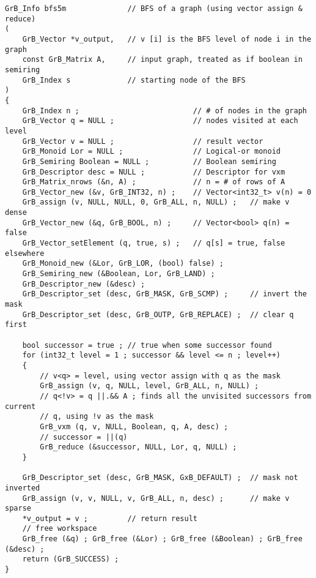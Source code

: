 \documentclass[12pt]{article}
\begin{document}
\newpage
\begin{mdframed}[userdefinedwidth=6in]
{\footnotesize
\begin{verbatim}
GrB_Info bfs5m              // BFS of a graph (using vector assign & reduce)
(
    GrB_Vector *v_output,   // v [i] is the BFS level of node i in the graph
    const GrB_Matrix A,     // input graph, treated as if boolean in semiring
    GrB_Index s             // starting node of the BFS
)
{
    GrB_Index n ;                          // # of nodes in the graph
    GrB_Vector q = NULL ;                  // nodes visited at each level
    GrB_Vector v = NULL ;                  // result vector
    GrB_Monoid Lor = NULL ;                // Logical-or monoid
    GrB_Semiring Boolean = NULL ;          // Boolean semiring
    GrB_Descriptor desc = NULL ;           // Descriptor for vxm
    GrB_Matrix_nrows (&n, A) ;             // n = # of rows of A
    GrB_Vector_new (&v, GrB_INT32, n) ;    // Vector<int32_t> v(n) = 0
    GrB_assign (v, NULL, NULL, 0, GrB_ALL, n, NULL) ;   // make v dense
    GrB_Vector_new (&q, GrB_BOOL, n) ;     // Vector<bool> q(n) = false
    GrB_Vector_setElement (q, true, s) ;   // q[s] = true, false elsewhere
    GrB_Monoid_new (&Lor, GrB_LOR, (bool) false) ;
    GrB_Semiring_new (&Boolean, Lor, GrB_LAND) ;
    GrB_Descriptor_new (&desc) ;
    GrB_Descriptor_set (desc, GrB_MASK, GrB_SCMP) ;     // invert the mask
    GrB_Descriptor_set (desc, GrB_OUTP, GrB_REPLACE) ;  // clear q first

    bool successor = true ; // true when some successor found
    for (int32_t level = 1 ; successor && level <= n ; level++)
    {
        // v<q> = level, using vector assign with q as the mask
        GrB_assign (v, q, NULL, level, GrB_ALL, n, NULL) ;
        // q<!v> = q ||.&& A ; finds all the unvisited successors from current
        // q, using !v as the mask
        GrB_vxm (q, v, NULL, Boolean, q, A, desc) ;
        // successor = ||(q)
        GrB_reduce (&successor, NULL, Lor, q, NULL) ;
    }

    GrB_Descriptor_set (desc, GrB_MASK, GxB_DEFAULT) ;  // mask not inverted
    GrB_assign (v, v, NULL, v, GrB_ALL, n, desc) ;      // make v sparse
    *v_output = v ;         // return result
    // free workspace
    GrB_free (&q) ; GrB_free (&Lor) ; GrB_free (&Boolean) ; GrB_free (&desc) ;
    return (GrB_SUCCESS) ;
} \end{verbatim}}
\end{mdframed}

\newpage
\end{document}

